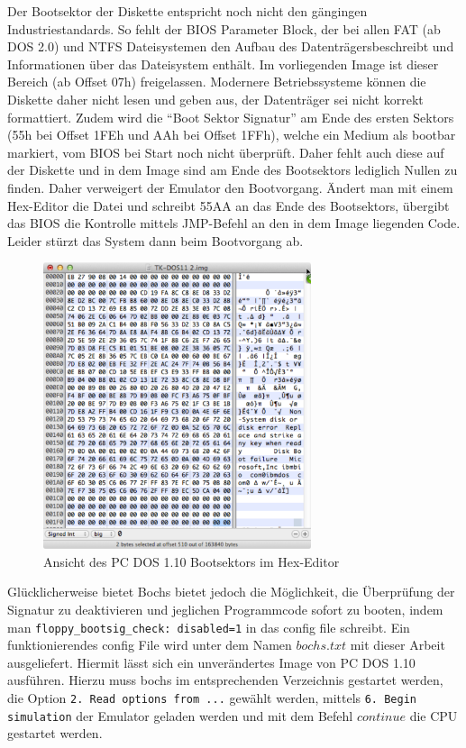	Der Bootsektor der Diskette entspricht noch nicht den gängingen Industriestandards.
	So fehlt der BIOS Parameter Block, der bei allen FAT (ab DOS 2.0) und NTFS Dateisystemen den Aufbau des Datenträgersbeschreibt und Informationen über das Dateisystem enthält. Im vorliegenden Image ist dieser Bereich (ab Offset 07h) freigelassen.
	Modernere Betriebssysteme können die Diskette daher nicht lesen und geben aus, der Datenträger sei nicht korrekt formattiert. 
	Zudem wird die "`Boot Sektor Signatur"' am Ende des ersten Sektors (55h bei Offset 1FEh und AAh bei Offset 1FFh), welche ein Medium als bootbar markiert, vom BIOS bei Start noch nicht überprüft. \cite{IBMTechRef} Daher fehlt auch diese auf der Diskette und in dem Image sind am Ende des Bootsektors lediglich Nullen zu finden.
	Daher verweigert der Emulator den Bootvorgang.
	Ändert man mit einem Hex-Editor die Datei und schreibt 55AA an das Ende des Bootsektors, übergibt das BIOS die Kontrolle mittels JMP-Befehl an den in dem Image liegenden Code. Leider stürzt das System dann beim Bootvorgang ab.

	\begin{figure}[h]
		\begin{center}
			\includegraphics[width=0.7\textwidth]{img/DOS110hex}
			\caption{Ansicht des PC DOS 1.10 Bootsektors im Hex-Editor}
			\label{fig:screenshot-hexeditor110}
		\end{center}
	\end{figure}

	Glücklicherweise bietet Bochs bietet jedoch die Möglichkeit, die Überprüfung der Signatur zu deaktivieren und jeglichen Programmcode sofort zu booten, indem man \lstinline{floppy_bootsig_check: disabled=1} in das config file schreibt.
	Ein funktionierendes config File wird unter dem Namen $bochs.txt$ mit dieser Arbeit ausgeliefert.
	Hiermit lässt sich ein unverändertes Image von PC DOS 1.10 ausführen.
	Hierzu muss bochs im entsprechenden Verzeichnis gestartet werden, die Option \lstinline{2. Read options from ...} gewählt werden, mittels \lstinline{6. Begin simulation} der Emulator geladen werden und mit dem Befehl $continue$ die CPU gestartet werden.

